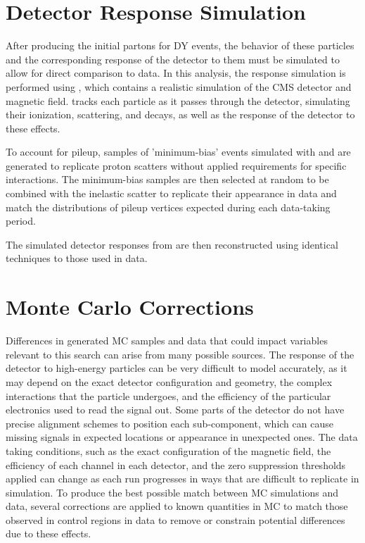 \section{Detector Response Simulation}

After producing the initial partons for DY events, the behavior of these particles and the corresponding response of the detector to them must be simulated to allow for direct comparison to data.
In this analysis, the response simulation is performed using \geant, which contains a realistic simulation of the CMS detector and magnetic field.
\geant tracks each particle as it passes through the detector, simulating their ionization, scattering, and decays, as well as the response of the detector to these effects.

To account for pileup, samples of 'minimum-bias' events simulated with \pythia and \geant are generated to replicate proton scatters without applied requirements for specific interactions.
The minimum-bias samples are then selected at random to be combined with the inelastic scatter to replicate their appearance in data and match the distributions of pileup vertices expected during each data-taking period.

The simulated detector responses from \geant are then reconstructed using identical techniques to those used in data. 

\section{Monte Carlo Corrections}
Differences in generated MC samples and data that could impact variables relevant to this search can arise from many possible sources.
The response of the detector to high-energy particles can be very difficult to model accurately, as it may depend on the exact detector configuration and geometry, the complex interactions that the particle undergoes, and the efficiency of the particular electronics used to read the signal out.
Some parts of the detector do not have precise alignment schemes to position each sub-component, which can cause missing signals in expected locations or appearance in unexpected ones. 
The data taking conditions, such as the exact configuration of the magnetic field, the efficiency of each channel in each detector, and the zero suppression thresholds applied can change as each run progresses in ways that are difficult to replicate in simulation.
To produce the best possible match between MC simulations and data, several corrections are applied to known quantities in MC to match those observed in control regions in data to remove or constrain potential differences due to these effects.

